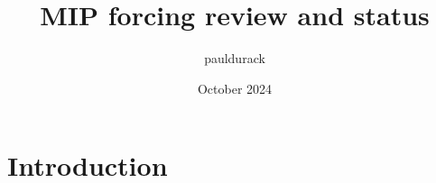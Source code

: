 \documentclass{article}
\title{MIP forcing review and status}
\author{pauldurack }
\date{October 2024}
\begin{document}
\maketitle

\section{Introduction}
\end{document}
